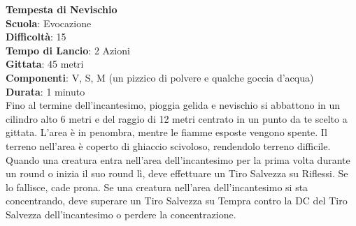 \begin{multicols}{2}
\medskip\textbf{Tempesta di Nevischio}\\
\textbf{Scuola}: Evocazione\\
\textbf{Difficoltà}:  15\\
\textbf{Tempo di Lancio}: 2 Azioni\\
\textbf{Gittata}: 45 metri\\
\textbf{Componenti}: V, S, M (un pizzico di polvere e qualche goccia d’acqua)\\
\textbf{Durata}: 1 minuto\\
Fino al termine dell'incantesimo, pioggia gelida e nevischio si abbattono in un cilindro alto 6 metri e del raggio di 12 metri centrato in un punto da te scelto a gittata. L’area è in penombra, mentre le fiamme esposte vengono spente. Il terreno nell'area è coperto di ghiaccio scivoloso, rendendolo terreno difficile. Quando una creatura entra nell'area dell'incantesimo per la prima volta durante un round o inizia il suo round lì, deve effettuare un Tiro Salvezza su Riflessi. Se lo fallisce, cade prona. Se una creatura nell'area dell'incantesimo si sta concentrando, deve superare un Tiro Salvezza su Tempra contro la DC del Tiro Salvezza dell'incantesimo o perdere la concentrazione. 


\end{multicols}
